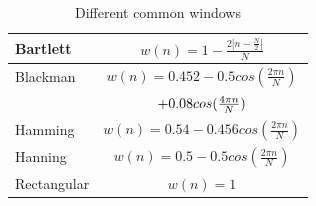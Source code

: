 \documentclass[twoside,twocolumn]{article}
\begin{document}
 \begin{table}

 	 \begin{center}

 	 	\begin{tabular}{ |l | c | }
 	 		\hline
 	 		Bartlett & $w(n)=1-\frac{2 |n-\frac{N}{2}|}{N}$ \\ \hline
 	 		Blackman &  $w(n)= 0.452 - 0.5cos(\frac{2\pi n}{N})$ \\
 	 		& $\space \space+ 0.08cos(\frac{4\pi n}{N})$ \\ \hline
 	 		Hamming & $w(n)=0.54 - 0.456 cos(\frac{2\pi n }{N})$ \\ \hline
 	 		Hanning& $w(n)=0.5 - 0.5 cos(\frac{2\pi n }{N})$\\ \hline
 	 		Rectangular& $w(n)=1$\\ \hline
 	 		
 	 	\end{tabular}
 	 	
 	 \end{center}
	 \caption{Different common windows}
 	 \label{table:tab1}

 \end{table}
\end{document}
